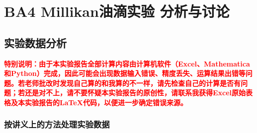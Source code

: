 \documentclass[dvipsnames, svgnames,a4paper,11pt]{article}
\begin{document}
	\section{BA4 Millikan油滴实验 \quad\heiti 分析与讨论}
	\subsection{实验数据分析}
	\textcolor{red}{\textbf{特别说明：由于本实验报告全部计算内容由计算机软件（Excel、Mathematica和Python）完成，因此可能会出现数据输入错误、精度丢失、运算结果出错等问题。若老师批改时发现自己算的和我算的不一样，请先检查自己的计算是否有问题；若还是对不上，请不要怀疑本实验报告的原创性，请联系我获得Excel原始表格及本实验报告的\LaTeX 代码，以便进一步确定错误来源。}}
	\subsubsection{按讲义上的方法处理实验数据}
\end{document}
